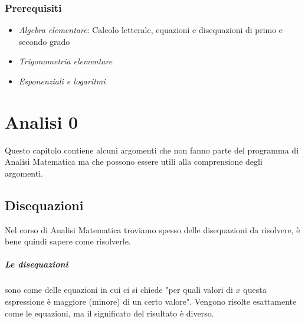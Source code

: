 \documentclass[12pt, a4paper, openany]{book}
\begin{document}
\subsection*{Prerequisiti}
\begin{itemize}
	\item \emph{Algebra elementare}: Calcolo letterale, equazioni e disequazioni di primo e secondo grado
	\item \emph{Trigonometria elementare}
	\item \emph{Esponenziali e logaritmi}
\end{itemize}


\chapter{Analisi 0}
Questo capitolo contiene alcuni argomenti che non fanno parte del programma di Analisi Matematica ma che possono essere utili alla comprensione degli argomenti.

\section{Disequazioni}
Nel corso di Analisi Matematica troviamo spesso delle disequazioni da risolvere, è bene quindi sapere come risolverle.

\paragraph*{Le disequazioni} sono come delle equazioni in cui ci si chiede "per quali valori di $x$ questa espressione è maggiore (minore) di un certo valore".
Vengono risolte esattamente come le equazioni, ma il significato del risultato è diverso.
\end{document}
